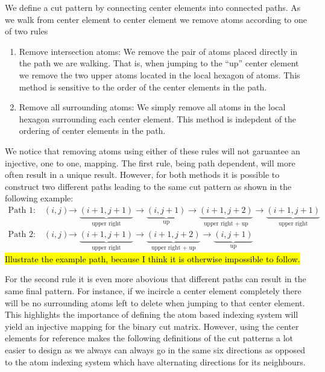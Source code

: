 We define a cut pattern by connecting center elements into connected paths. As
we walk from center element to center element we remove atoms according to one of two rules 
\begin{enumerate}
  \item Remove intersection atoms: We remove the pair of atoms placed directly
  in the path we are walking. That is, when jumping to the ``up'' center
  element we remove the two upper atoms located in the local hexagon of atoms.
  This method is sensitive to the order of the center elements in the path. 
  \item Remove all surrounding atoms: We simply remove all atoms in the local
  hexagon surrounding each center element. This method is indepdent of the
  ordering of center elements in the path.
\end{enumerate}
We notice that removing atoms using either of these rules will not garuantee an injective, one to one, mapping. The first rule, being path dependent, will more often result in a unique result. However, for both methods it is possible to construct two different paths leading to the same cut pattern as shown in the following example:
\begin{align*}
  \text{Path 1:} \quad (i, j) &\rightarrow \underbrace{(i+1,j+1)}_{\text{upper right}} \rightarrow \underbrace{(i, j+1)}_{\text{up}} \rightarrow \underbrace{(i+1, j+2)}_{\text{upper right + up}} \rightarrow \underbrace{(i+1, j+1)}_{\text{upper right}} \\
  \text{Path 2:} \quad (i, j) &\rightarrow \underbrace{(i+1,j+1)}_{\text{upper right}} \rightarrow \underbrace{(i+1, j+2)}_{\text{upper right + up}} \rightarrow \underbrace{(i, j+1)}_{\text{up}}
\end{align*}
\hl{Illustrate the example path, because I think it is otherwise impossible to follow.}

For the second rule it is even more abovious that different paths can result in the same final pattern. For instance, if we incircle a center element completely there will be no surrounding atoms left to delete when jumping to that center element. This highlights the importance of defining the atom based indexing system will yield an injective mapping for the binary cut matrix. However, using the center elements for reference makes the following definitions of the cut patterns a lot easier to design as we always can always go in the same six directions as opposed to the atom indexing system which have alternating directions for its neighbours. 


